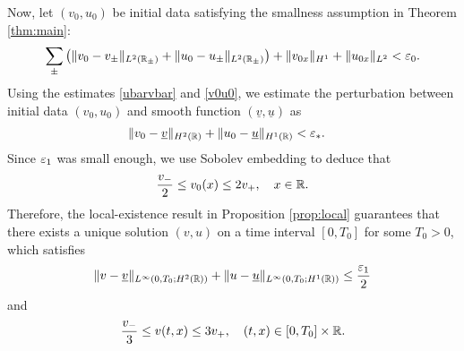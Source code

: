 \documentclass[11pt,reqno]{amsart}
\begin{document}
Now, let $(v_0,u_0)$ be initial data satisfying the smallness assumption in Theorem \ref{thm:main}:
\begin{equation} \label{v0u0}
    \sum_{\pm}\left(\|v_0-v_{\pm}\|_{L^2(\mathbb{R}_\pm)}+\|u_0-u_\pm\|_{L^2(\mathbb{R}_\pm)}\right)+\|v_{0x}\|_{H^1}+\|u_{0x}\|_{L^2}<\varepsilon_0.
\end{equation}
	Using the estimates  \eqref{ubarvbar} and \eqref{v0u0}, we estimate the perturbation between initial data $(v_0,u_0)$ and smooth function $(\underline{v},\underline{u})$ as
	\begin{align} \label{v0v_}
	&\|v_0-\underline{v}\|_{H^2(\mathbb{R})}+\|u_0-\underline{u}\|_{H^1(\mathbb{R})}
    < \varepsilon_*.
	\end{align}
	Since $\varepsilon_1$ was small enough, we use Sobolev embedding to deduce that
	\[\frac{v_-}{2}\le v_0(x)\le 2v_+,\quad x\in\mathbb{R}.\]
	Therefore, the local-existence result in Proposition \ref{prop:local} guarantees that there exists a unique solution $(v,u)$ on a time interval $[0,T_0]$ for some $T_0 > 0$, which satisfies 
	\begin{equation}\label{est-local-1}
	\|v-\underline{v}\|_{L^\infty(0,T_0;H^2(\mathbb{R}))}+\|u-\underline{u}\|_{L^\infty(0,T_0;H^1(\mathbb{R}))}\le \frac{\varepsilon_1}{2}
	\end{equation}
	and
	\[\frac{v_-}{3}\le v(t,x)\le 3v_+,\quad (t,x)\in[0,T_0]\times\mathbb{R}.\]
    
\end{document}
